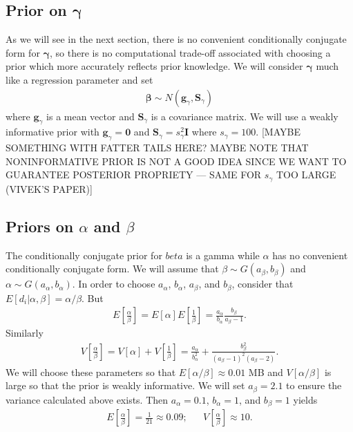 \documentclass{article}
\begin{document}
\subsection{Prior on $\bm{\gamma}$}
As we will see in the next section, there is no convenient conditionally conjugate form for $\bm{\gamma}$, so there is no computational trade-off associated with choosing a prior which more accurately reflects prior knowledge. We will consider $\bm{\gamma}$ much like a regression parameter and set
\begin{align*}
\bm{\beta} \sim N(\bm{g}_\gamma, \bm{S}_\gamma)
\end{align*}
where $\bm{g}_\gamma$ is a mean vector and $\bm{S}_\gamma$ is a covariance matrix. We will use a weakly informative prior with $\bm{g}_\gamma = \bm{0}$ and $\bm{S}_\gamma = s^2_\gamma\bm{I}$ where $s_\gamma = 100$.  [MAYBE SOMETHING WITH FATTER TAILS HERE? MAYBE NOTE THAT NONINFORMATIVE PRIOR IS NOT A GOOD IDEA SINCE WE WANT TO GUARANTEE POSTERIOR PROPRIETY --- SAME FOR $s_\gamma$ TOO LARGE (VIVEK'S PAPER)]

\subsection{Priors on $\alpha$ and $\beta$}
The conditionally conjugate prior for $beta$ is a gamma while $\alpha$ has no convenient conditionally conjugate form. We will assume that $\beta \sim G(a_\beta, b_\beta)$ and $\alpha \sim G(a_\alpha, b_\alpha)$. In order to choose $a_\alpha$, $b_\alpha$, $a_\beta$, and $b_\beta$, consider that $E[d_i|\alpha,\beta] = \alpha/\beta$. But 
\begin{align*}
E\left[\frac{\alpha}{\beta}\right] = E[\alpha]E\left[\frac{1}{\beta}\right] = \frac{a_\alpha}{b_\alpha}\frac{b_\beta}{a_\beta - 1}.
\end{align*}
Similarly
\begin{align*}
V\left[\frac{\alpha}{\beta}\right] = V[\alpha] + V\left[\frac{1}{\beta}\right] = \frac{a_\alpha}{b_\alpha^2} + \frac{b_\beta^2}{(a_\beta - 1)^2(a_\beta - 2)}.
\end{align*}
We will choose these parameters so that $E[\alpha/\beta] \approx 0.01$ MB and $V[\alpha/\beta]$ is large so that the prior is weakly informative. We will set $a_\beta = 2.1$ to ensure the variance calculated above exists. Then $a_\alpha = 0.1$, $b_\alpha = 1$, and $b_\beta = 1$ yields
\begin{align*}
E\left[\frac{\alpha}{\beta}\right] = \frac{1}{21} \approx 0.09; && V\left[\frac{\alpha}{\beta}\right] \approx 10.
\end{align*}
\end{document}
